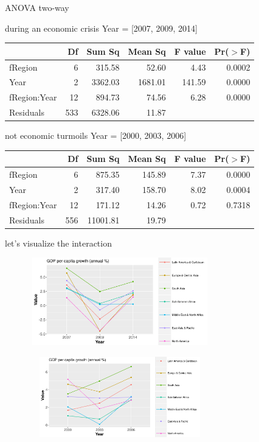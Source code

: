 \documentclass[9pt]{beamer}
\begin{document}
\begin{frame}{ANOVA two-way}
	
	\begin{block}{during an economic crisis}
		Year = {[2007, 2009, 2014]}
		\begin{table}[ht]
			\centering
			\begin{tabular}{lrrrrr}
				\hline
				& Df & Sum Sq & Mean Sq & F value & Pr($>$F) \\ 
				\hline
				fRegion & 6 & 315.58 & 52.60 & 4.43 & 0.0002 \\ 
				Year & 2 & 3362.03 & 1681.01 & 141.59 & 0.0000 \\ 
				fRegion:Year & 12 & 894.73 & 74.56 & 6.28 & 0.0000 \\ 
				Residuals & 533 & 6328.06 & 11.87 &  &  \\ 
				\hline
			\end{tabular}
		\end{table}
	\end{block}
	
	\begin{block}{not economic turmoils}
		Year = {[2000, 2003, 2006]}
		\begin{table}[ht]
			\centering
			\begin{tabular}{lrrrrr}
				\hline
				& Df & Sum Sq & Mean Sq & F value & Pr($>$F) \\ 
				\hline
				fRegion & 6 & 875.35 & 145.89 & 7.37 & 0.0000 \\ 
				Year & 2 & 317.40 & 158.70 & 8.02 & 0.0004 \\ 
				fRegion:Year & 12 & 171.12 & 14.26 & 0.72 & 0.7318 \\ 
				Residuals & 556 & 11001.81 & 19.79 &  &  \\ 
				\hline
			\end{tabular}
		\end{table}
	\end{block}
\end{frame}


\begin{frame}{let's visualize the interaction}
	\begin{block}{}
		\includegraphics[height=3.8cm,width = 10cm]{inter1.png}
	\end{block}
	\begin{block}{}
		\includegraphics[height=3.5cm,width = 10cm]{inter2.png}
	\end{block}
\end{frame}
\end{document}
